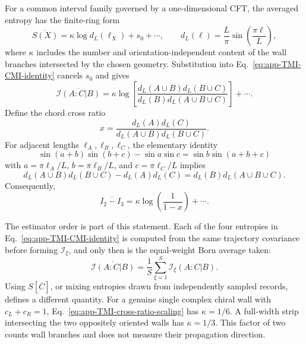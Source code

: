 For a common interval family governed by a one-dimensional CFT, the averaged
entropy has the finite-ring form~\cite{CalabreseCardy2004}
\begin{equation}
    \overline{S(X)}
    =\kappa\log d_L(\ell_X)+s_0+\cdots,
    \qquad
    d_L(\ell)=\frac{L}{\pi}\sin\!\left(\frac{\pi\ell}{L}\right),
    \label{eq:app-CFT-entropy-common-family}
\end{equation}
where \(\kappa\) includes the number and orientation-independent content of
the wall branches intersected by the chosen geometry.  Substitution into
Eq.~\eqref{eq:app-TMI-CMI-identity} cancels \(s_0\) and gives
\begin{equation}
    \overline{\mathcal I(A:C|B)}
    =\kappa\log\!\left[
      \frac{d_L(A\cup B)d_L(B\cup C)}
           {d_L(B)d_L(A\cup B\cup C)}\right]+\cdots .
    \label{eq:app-CMI-chord-ratio}
\end{equation}
Define the chord cross ratio
\begin{equation}
    x=\frac{d_L(A)d_L(C)}
            {d_L(A\cup B)d_L(B\cup C)}.
    \label{eq:app-CMI-cross-ratio}
\end{equation}
For adjacent lengths \(\ell_A,\ell_B,\ell_C\), the elementary identity
\begin{equation}
    \sin(a+b)\sin(b+c)-\sin a\sin c
    =\sin b\sin(a+b+c)
\end{equation}
with \(a=\pi\ell_A/L\), \(b=\pi\ell_B/L\), and
\(c=\pi\ell_C/L\) implies
\begin{equation}
    d_L(A\cup B)d_L(B\cup C)-d_L(A)d_L(C)
    =d_L(B)d_L(A\cup B\cup C).
    \label{eq:app-chord-cross-ratio-identity}
\end{equation}
Consequently,
\begin{equation}
    \boxed{
    \overline{I_2-I_3}
    =\kappa\log\!\left(\frac{1}{1-x}\right)+\cdots .}
    \label{eq:app-TMI-cross-ratio-scaling}
\end{equation}

The estimator order is part of this statement.  Each of the four entropies in
Eq.~\eqref{eq:app-TMI-CMI-identity} is computed from the same trajectory
covariance before forming \(\mathcal I_\xi\), and only then is the equal-weight
Born average taken:
\begin{equation}
    \overline{\mathcal I(A:C|B)}
    =\frac1S\sum_{\xi=1}^{S}\mathcal I_\xi(A:C|B).
    \label{eq:app-trajectory-first-CMI-average}
\end{equation}
Using \(S[\overline C]\), or mixing entropies drawn from independently sampled
records, defines a different quantity.  For a genuine single complex chiral
wall with \(c_L+c_R=1\), Eq.~\eqref{eq:app-TMI-cross-ratio-scaling} has
\(\kappa=1/6\).  A full-width strip intersecting the two oppositely oriented
walls has \(\kappa=1/3\).  This factor of two counts wall branches and does not
measure their propagation direction.

